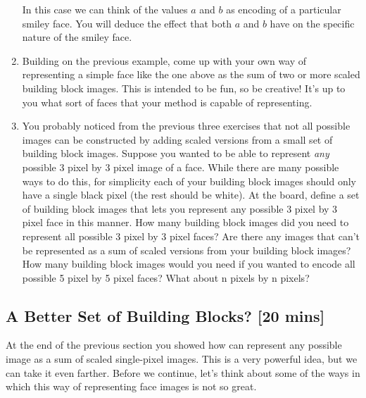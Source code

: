 \begin{prob}
\begin{enumerate}
In this case we can think of the values $a$ and $b$ as encoding of a particular smiley face.  You will deduce the effect that both $a$ and $b$ have on the specific nature of the smiley face.

\item Building on the previous example, come up with your own way of representing a simple face like the one above as the sum of two or more scaled building block images.  This is intended to be fun, so be creative!  It's up to you what sort of faces that your method is capable of representing.

\item You probably noticed from the previous three exercises that not all possible images can be constructed by adding scaled versions from a small set of building block images.  Suppose you wanted to be able to represent \emph{any} possible 3 pixel by 3 pixel image of a face.  While there are many possible ways to do this, for simplicity each of your building block images should only have a single black pixel (the rest should be white).  At the board, define a set of building block images that lets you represent any possible 3 pixel by 3 pixel face in this manner.  How many building block images did you need to represent all possible 3 pixel by 3 pixel faces?  Are there any images that can't be represented as a sum of scaled versions from your building block images?  How many building block images would you need if you wanted to encode all possible 5 pixel by 5 pixel faces?  What about n pixels by n pixels?  

\end{enumerate}
\end{prob}

\subsection{A Better Set of Building Blocks? [20 mins]}

At the end of the previous section you showed how can represent any possible image as a sum of scaled single-pixel images.  This is a very powerful idea, but we can take it even farther.  Before we continue, let's think about some of the ways in which this way of representing face images is not so great.

